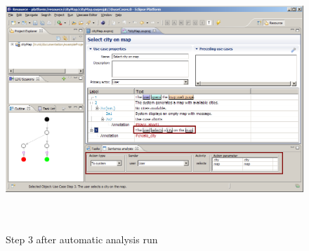 \begin{figure}[ht]
  \centering
  \includegraphics[height=280pt]{images/manual-analysis/step3-automatic-after}
  \caption{Step 3 after automatic analysis run}
\end{figure}